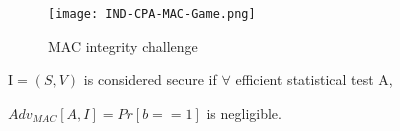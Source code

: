 \begin{figure}[ht!]
	\centering
		\texttt{[image: IND-CPA-MAC-Game.png]}
	\caption{MAC integrity challenge}
	\label{fig:MACIntegrityChallenge}
\end{figure}

\begin{mydef}
I$=(S,V)$ is considered secure if $\forall$ efficient statistical test A, 
\begin{flushright}
$Adv_{MAC}[A,I] = Pr[ b == 1] $ is negligible.
\end{flushright} 
\end{mydef}


